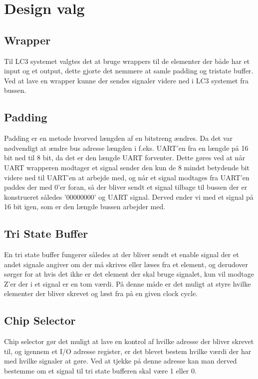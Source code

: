 \section{Design valg}

\subsection{Wrapper}
Til LC3 systemet valgtes det at bruge wrappers til de elementer der både har et input og et output, dette gjorte det nemmere at samle padding og tristate buffer. Ved at lave en wrapper kunne der sendes signaler videre ned i LC3 systemet fra bussen.

\subsection{Padding}
Padding er en metode hvorved længden af en bitstreng ændres. Da det var nødvendigt at ændre bus adresse længden i f.eks. UART'en fra en længde på 16 bit ned til 8 bit, da det er den længde UART forventer. Dette gøres ved at når UART wrapperen modtager et signal sender den kun de 8 mindst betydende bit videre ned til UART'en at arbejde med, og når et signal modtages fra UART'en paddes der med 0'er foran, så der bliver sendt et signal tilbage til bussen der er konstrueret således '00000000' og UART signal. Derved ender vi med et signal på 16 bit igen, som er den længde bussen arbejder med. 


\subsection{Tri State Buffer}
En tri state buffer fungerer således at der bliver sendt et enable signal der et andet signale angiver om der må skrives eller læses fra et element, og derudover sørger for at hvis det ikke er det element der skal bruge signalet, kun vil modtage Z'er der i et signal er en tom værdi. På denne måde er det muligt at styre hvilke elementer der bliver skrevet og læst fra på en given clock cycle. 


\subsection{Chip Selector}
Chip selector gør det muligt at lave en kontrol af hvilke adresse der bliver skrevet til, og igennem et I/O adresse register, er det blevet bestem hvilke værdi der har med hvilke signaler at gøre. Ved at tjekke på denne adresse kan man derved bestemme om et signal til tri state bufferen skal være 1 eller 0.

